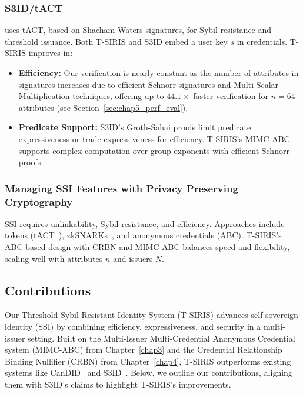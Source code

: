 \subsubsection*{S3ID/tACT} \cite{rabaninejad_attribute-based_2024} uses tACT, based on Shacham-Waters signatures, for Sybil resistance and threshold issuance. Both T-SIRIS and S3ID embed a user key $s$ in credentials. T-SIRIS improves in:
\begin{itemize}
    \item \textbf{Efficiency:} Our verification is nearly constant as the number of attributes in signatures increases due to efficient Schnorr signatures and Multi-Scalar Multiplication techniques, offering up to $44.1\times$ faster verification for $n=64$ attributes (see Section~\ref{sec:chap5_perf_eval}).
    \item \textbf{Predicate Support:} S3ID’s Groth-Sahai proofs limit predicate expressiveness or trade expressiveness for efficiency. T-SIRIS’s MIMC-ABC supports complex computation over group exponents with efficient Schnorr proofs.
\end{itemize}


\subsubsection*{Managing SSI Features with Privacy Preserving Cryptography}
SSI requires unlinkability, Sybil resistance, and efficiency. Approaches include tokens (tACT~\cite{rabaninejad_attribute-based_2024}), zkSNARKs~\cite{rosenberg_zk-creds_2022}, and anonymous credentials (ABC). T-SIRIS’s ABC-based design with CRBN and MIMC-ABC balances speed and flexibility, scaling well with attributes $n$ and issuers $N$.


\subsection{Contributions}
\label{sec:tsiris_contributions}

Our Threshold Sybil-Resistant Identity System (T-SIRIS) advances self-sovereign identity (SSI) by combining efficiency, expressiveness, and security in a multi-issuer setting. Built on the Multi-Issuer Multi-Credential Anonymous Credential system (MIMC-ABC) from Chapter~\ref{chap3} and the Credential Relationship Binding Nullifier (CRBN) from Chapter~\ref{chap4}, T-SIRIS outperforms existing systems like CanDID~\cite{maram_candid_2020} and S3ID~\cite{rabaninejad_attribute-based_2024}. Below, we outline our contributions, aligning them with S3ID’s claims to highlight T-SIRIS’s improvements.

